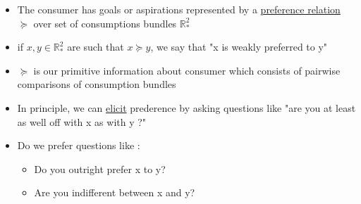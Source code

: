 \documentclass[twoside]{article}
\begin{document}
\begin{itemize}
\item The consumer has goals or aspirations represented by a \underline{preference relation} \(\succeq\) over set of consumptions bundles \(\mathbb{R}^2_*\)
\item if \(x, y \in \mathbb{R}^2_*\) are such that \(x \succeq y\), we say that "x is weakly preferred to y"
\item \(\succeq\) is our primitive information about consumer which consists of pairwise comparisons of consumption bundles 
\item In principle, we can \underline{elicit} prederence by asking questions like "are you at least as well off with x as with y ?"
\item Do we prefer questions like : 
\begin{itemize}
\item Do you outright prefer x to y?
\item Are you indifferent between x and y? 
\end{itemize}
\end{itemize}
\end{document}
